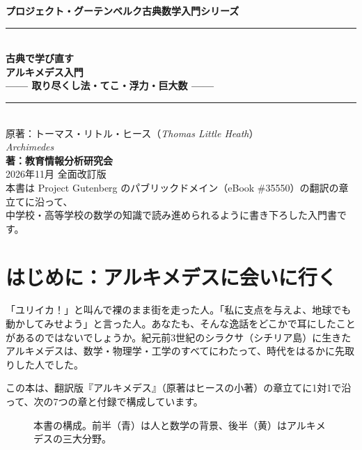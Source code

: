 \documentclass[a4paper,11pt,openany]{ltjsbook}
\begin{document}
\begin{titlepage}
\begin{center}
\vspace*{1.5cm}
{\Large\bfseries プロジェクト・グーテンベルク古典数学入門シリーズ}\\[0.8cm]
\rule{\textwidth}{1.5pt}\\[0.4cm]
{\Huge\bfseries 古典で学び直す\\アルキメデス入門}\\[0.4cm]
{\Large\bfseries —— 取り尽くし法・てこ・浮力・巨大数 ——}\\[0.4cm]
\rule{\textwidth}{1.5pt}\\[1.5cm]
{\large 原著：トーマス・リトル・ヒース（\textit{Thomas Little Heath}）\\
\textit{Archimedes}}\\[2.0cm]
{\Large\bfseries 著：教育情報分析研究会}\\[2.5cm]
\vfill
{\large 2026年11月 全面改訂版}\\[0.5cm]
{\footnotesize 本書は Project Gutenberg のパブリックドメイン（eBook \#35550）の翻訳の章立てに沿って、\\
中学校・高等学校の数学の知識で読み進められるように書き下ろした入門書です。}
\end{center}
\end{titlepage}

\frontmatter
\tableofcontents
\mainmatter

\chapter*{はじめに：アルキメデスに会いに行く}

「ユリイカ！」と叫んで裸のまま街を走った人。「私に支点を与えよ、地球でも動かしてみせよう」と言った人。あなたも、そんな逸話をどこかで耳にしたことがあるのではないでしょうか。紀元前3世紀のシラクサ（シチリア島）に生きたアルキメデスは、数学・物理学・工学のすべてにわたって、時代をはるかに先取りした人でした。

この本は、翻訳版『アルキメデス』（原著はヒースの小著）の章立てに1対1で沿って、次の7つの章と付録で構成しています。

\begin{figure}[htbp]
\centering
{}
\caption{本書の構成。前半（青）は人と数学の背景、後半（黄）はアルキメデスの三大分野。}
\end{figure}
\end{document}
